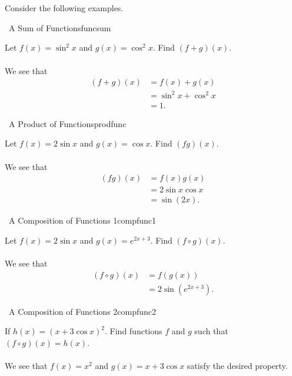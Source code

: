 		\vphantom
		\\
		\\
		Consider the following examples.
		\begin{example}{\Difficulty\,\Difficulty\,\,A Sum of Functions}{funcsum}

			Let \(f(x)=\sin^2x\) and \(g(x)=\cos^2x\). Find \((f+g)(x)\).
			\\
			\\
			We see that
			\begin{align*}
				(f+g)(x)&=f(x)+g(x) \\
				&=\sin^2x+\cos^2x \\
				&=1.
			\end{align*}
		\end{example}
		\begin{example}{\Difficulty\,\Difficulty\,\,A Product of Functions}{prodfunc}

			Let \(f(x)=2\sin x\) and \(g(x)=\cos x\). Find \((fg)(x)\).
			\\
			\\
			We see that
			\begin{align*}
				(fg)(x)&=f(x)g(x) \\
				&=2\sin x\cos x \\
				&=\sin(2x).
			\end{align*}
		\end{example}
		\begin{example}{\Difficulty\,\Difficulty\,\,A Composition of Functions 1}{compfunc1}

			Let \(f(x)=2\sin x\) and \(g(x)=e^{2x+3}\). Find \((f\circ g)(x)\).
			\\
			\\
			We see that
			\begin{align*}
				(f\circ g)(x)&=f(g(x)) \\
				&=2\sin(e^{2x+3}).
			\end{align*}
		\end{example}
		\begin{example}{\Difficulty\,\Difficulty\,\,A Composition of Functions 2}{compfunc2}

			If \(h(x)=(x+3\cos x)^2\). Find functions \(f\) and \(g\) such that \((f\circ g)(x)=h(x)\).
			\\
			\\
			We see that \(f(x)=x^2\) and \(g(x)=x+3\cos x\) satisfy the desired property.

		\end{example}